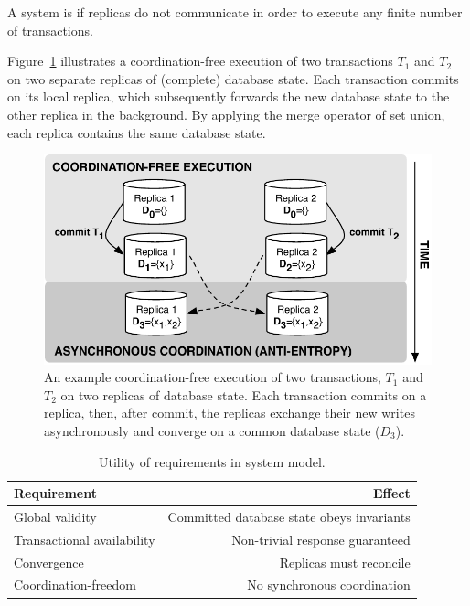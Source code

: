 \begin{definition}
A system is \textit{\cfree} if replicas do not communicate in order to
execute any finite number of transactions.
\end{definition}

Figure~\ref{fig:replicas} illustrates a coordination-free execution of
two transactions $T_1$ and $T_2$ on two separate replicas of
(complete) database state. Each transaction commits on its local
replica, which subsequently forwards the new database state to the
other replica in the background. By applying the merge operator of set
union, each replica contains the same database state.

\begin{figure}
\begin{center}
\includegraphics[width=.85\columnwidth]{figs/replicas.pdf}
\end{center}\vspace{-1em}
\caption{An example coordination-free execution of two transactions,
  $T_1$ and $T_2$ on two replicas of database state. Each transaction
  commits on a replica, then, after commit, the replicas exchange
  their new writes asynchronously and converge on a common database
  state ($D_3$).}
\label{fig:replicas}
\end{figure}


\begin{table}
\begin{center}
\small
\begin{tabular}{|l|r|}
\hline\textbf{Requirement} & \textbf{Effect}  \\\hline
Global validity & Committed database state obeys invariants  \\
Transactional availability & Non-trivial response guaranteed \\
Convergence & Replicas must reconcile \\
Coordination-freedom & No synchronous coordination\\\hline
\end{tabular}
\end{center}\vspace{-1em}
\caption{Utility of requirements in system model.}
\label{table:requirements}
\end{table}


